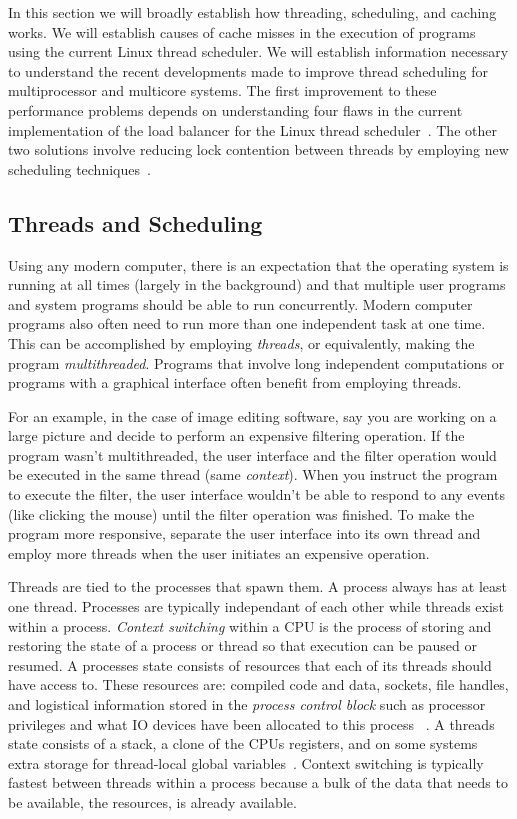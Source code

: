 \documentclass{sig-alternate}
\begin{document}
In this section we will broadly establish how threading, scheduling, and caching works. We will establish causes of cache misses in the execution of programs using the current Linux thread scheduler. We will establish information necessary to understand the recent developments made to improve thread scheduling for multiprocessor and multicore systems. The first improvement to these performance problems depends on understanding four flaws in the current implementation of the load balancer for the Linux thread scheduler~\cite{Lozi:2016}. The other two solutions involve reducing lock contention between threads by employing new scheduling techniques~\cite{KumarEtal:2014,HeeseungEtal:2017}.

\subsection{Threads and Scheduling}
\label{sec:threads}
Using any modern computer, there is an expectation that the operating system is running at all times (largely in the background) and that multiple user programs and system programs should be able to run concurrently. Modern computer programs also often need to run more than one independent task at one time. This can be accomplished by employing \emph{threads}, or equivalently, making the program \emph{multithreaded}. Programs that involve long independent computations or programs with a graphical interface often benefit from employing threads.

For an example, in the case of image editing software, say you are working on a large picture and decide to perform an expensive filtering operation. If the program wasn't multithreaded, the user interface and the filter operation would be executed in the same thread (same \emph{context}). When you instruct the program to execute the filter, the user interface wouldn't be able to respond to any events (like clicking the mouse) until the filter operation was finished. To make the program more responsive, separate the user interface into its own thread and employ more threads when the user initiates an expensive operation.
	
Threads are tied to the processes that spawn them. A process always has at least one thread. Processes are typically independant of each other while threads exist within a process. \emph{Context switching} within a CPU is the process of storing and restoring the state of a process or thread so that execution can be paused or resumed. A processes state consists of resources that each of its threads should have access to. These resources are: compiled code and data, sockets, file handles, and logistical information stored in the \emph{process control block} such as processor privileges and what IO devices have been allocated to this process ~\cite{WikiThreads,WikiProcessControlBlock}. A threads state consists of a stack, a clone of the CPUs registers, and on some systems extra storage for thread-local global variables~\cite{WikiThreads,WikiThreadLocalStorage}. Context switching is typically fastest between threads within a process because a bulk of the data that needs to be available, the resources, is already available.~\cite{WikiThreads} 
\end{document}
